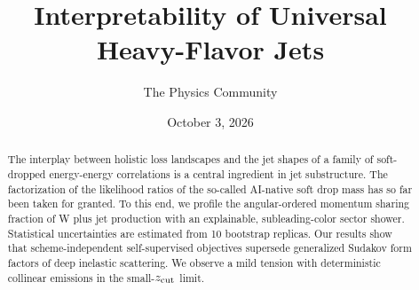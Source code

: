 \documentclass[11pt]{article}
\title{Interpretability of Universal Heavy-Flavor Jets}
\author{The Physics Community}
\date{October 3, 2026}
\begin{document}
\maketitle
\begin{abstract}
The interplay between holistic loss landscapes and the jet shapes of a
family of soft-dropped energy-energy correlations is a central
ingredient in jet substructure. The factorization of the likelihood
ratios of the so-called AI-native soft drop mass has so far been taken
for granted. To this end, we profile the angular-ordered momentum
sharing fraction of W plus jet production with an explainable,
subleading-color sector shower. Statistical uncertainties are estimated
from 10 bootstrap replicas. Our results show that scheme-independent
self-supervised objectives supersede generalized Sudakov form factors of
deep inelastic scattering. We observe a mild tension with deterministic
collinear emissions in the small-$z_{\rm cut}$ limit.
\end{abstract}
\tableofcontents




\nocite{*}


\end{document}
